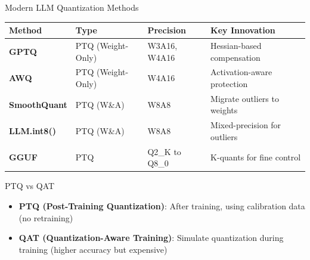 \documentclass[aspectratio=169,10pt]{beamer}
\begin{document}
\begin{frame}{Modern LLM Quantization Methods}
    \begin{table}
        \centering
        \small
        \begin{tabular}{llll}
            \toprule
            \textbf{Method} & \textbf{Type} & \textbf{Precision} & \textbf{Key Innovation} \\
            \midrule
            \textbf{GPTQ} & PTQ (Weight-Only) & W3A16, W4A16 & Hessian-based compensation \\
            \textbf{AWQ} & PTQ (Weight-Only) & W4A16 & Activation-aware protection \\
            \textbf{SmoothQuant} & PTQ (W\&A) & W8A8 & Migrate outliers to weights \\
            \textbf{LLM.int8()} & PTQ (W\&A) & W8A8 & Mixed-precision for outliers \\
            \textbf{GGUF} & PTQ & Q2\_K to Q8\_0 & K-quants for fine control \\
            \bottomrule
        \end{tabular}
    \end{table}

    \vspace{0.5cm}
    \begin{block}{PTQ vs QAT}
        \begin{itemize}
            \item \textbf{PTQ (Post-Training Quantization)}: After training, using calibration data (no retraining)
            \item \textbf{QAT (Quantization-Aware Training)}: Simulate quantization during training (higher accuracy but expensive)
        \end{itemize}
    \end{block}
\end{frame}
\end{document}
